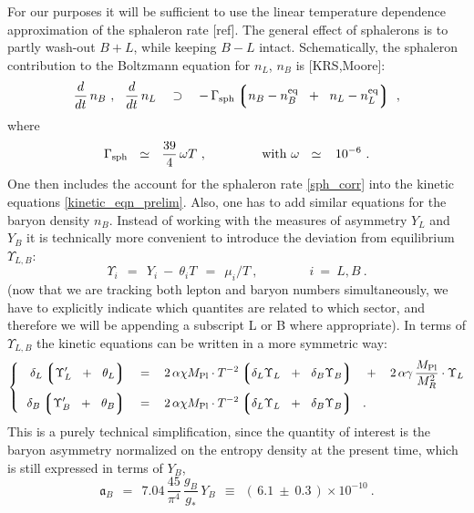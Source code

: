 \documentclass[12pt]{revtex4}
\newcommand{\eq}{{\rm eq}}
\newcommand{\lgr}{\left\lgroup}
\newcommand{\rgr}{\right\rgroup}
\newcommand{\Mpl}{M_{\rm Pl}}
\newcommand{\Gsph}{\Gamma_{\rm sph}}
\begin{document}
	For our purposes it will be sufficient to use the linear
	temperature dependence approximation of the sphaleron rate [ref]. 
	The general effect of sphalerons is to partly wash-out $ B + L $,
	while keeping $ B - L $ intact.
	Schematically, the sphaleron contribution to the Boltzmann equation
	for $ n_L $, $ n_B $ is [KRS,Moore]:
\begin{equation}
\label{sph_corr}
	\frac{d}{dt}\, n_B~,~~
	\frac{d}{dt}\, n_L
	~~~\supset~~~ -\, \Gsph 
		\lgr   n_B - n_B^\eq \;~+~\;
		       n_L - n_L^\eq 
		\rgr~,
\end{equation}
	where
\[
	\Gsph ~~\simeq~~ \frac{39}{4}\,\omega T~, \qquad\qquad 
	{\rm ~with~}
	\omega ~~\simeq~~ \,10^{-6}~.
\]
	One then includes the account for the sphaleron rate \eqref{sph_corr}
	into the kinetic equations \eqref{kinetic_eqn_prelim}.
	Also, one has to add similar equations for the baryon density $ n_B $.
	Instead of working with the measures of asymmetry $ Y_L $ and 
	 $ Y_B $ it is technically more convenient to introduce the
	deviation from equilibrium $ \Upsilon_{L,B} $:
\[
	\Upsilon_i ~~=~~ Y_i ~-~ \theta_i T ~~=~~ \mu_i/T~,
	\qquad\qquad i~=~L,B~.
\]
	(now that we are tracking both lepton and baryon numbers 
	simultaneously, we have to explicitly indicate which quantites
	are related to which sector, and therefore we will be appending
	a subscript L or B where appropriate).
	In terms of $ \Upsilon_{L,B} $
	the kinetic equations can be written in a more symmetric way:
\begin{equation}
\label{eqn_ups}
\left\{~~
\begin{split}
	\delta_L \lgr \Upsilon_L' ~~+~~ \theta_L \rgr
	& ~~\;=~~\;
	2\, \alpha\chi \Mpl \cdot T^{-2} 
	\lgr \delta_L \Upsilon_L ~~+~~ \delta_B \Upsilon_B \rgr 
	\;~~+~~\;
	2\, \alpha\gamma\, \frac{\Mpl}{M_R^2} \cdot \Upsilon_L \\
	\delta_B \lgr \Upsilon_B' ~~+~~ \theta_B \rgr
	& ~~\;=~~\;
	2\, \alpha\chi \Mpl \cdot T^{-2} 
	\lgr \delta_L \Upsilon_L ~~+~~ \delta_B \Upsilon_B \rgr 
	~~.
\end{split}
\right.
\end{equation}
	This is a purely technical simplification, since
	the quantity of interest is the baryon asymmetry normalized on the
	entropy density at the present time, which is still expressed
	in terms of $ Y_B $,
\begin{equation}
\label{def_asy}
	\mathfrak{a}_B ~~=~~ 7.04\, \frac{45}{\pi^4}\, \frac{g_B}{g_*}\, Y_B
		~~\equiv~~ (\, 6.1 ~\pm~ 0.3 \,)\times 10^{-10}~.
\end{equation}
\end{document}
